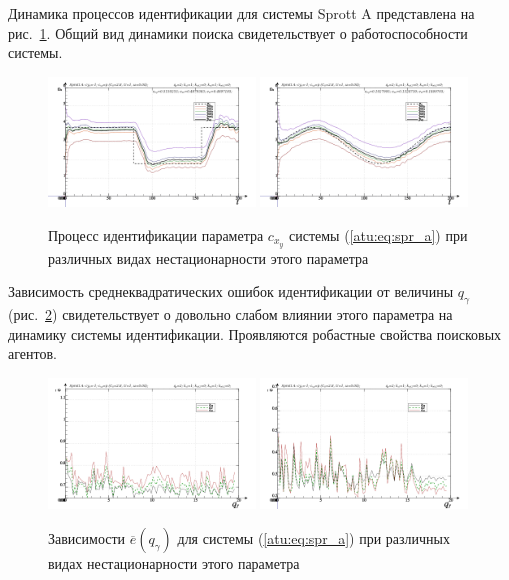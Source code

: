 Динамика процессов идентификации для системы Sprott A представлена на рис.~\ref{atu:f:spr_a_id}.
Общий вид динамики поиска свидетельствует о работоспособности системы.

\begin{figure}[htb!]
\centerline{
  \includegraphics[width=0.49\textwidth]{p/cha/spr_a/sprott_a_m5p-pl_n_sign.png}
  \includegraphics[width=0.49\textwidth]{p/cha/spr_a/sprott_a_m5p-pl_n_sin.png}
}
\caption{Процесс идентификации параметра $c_{x_y} $ системы (\ref{atu:eq:spr_a})
  при различных видах нестационарности этого параметра
}
\label{atu:f:spr_a_id}
\end{figure}

Зависимость среднеквадратических ошибок идентификации от величины $q_\gamma$ (рис.~\ref{atu:f:spr_a_e_qgamma})
свидетельствует о довольно слабом влиянии этого параметра
на динамику системы идентификации.
Проявляются робастные свойства поисковых агентов.

\begin{figure}[htb!]
\centerline{
  \includegraphics[width=0.49\textwidth]{p/cha/spr_a/sprott_a_m5p-p_qg_e_sign.png}
  \includegraphics[width=0.49\textwidth]{p/cha/spr_a/sprott_a_m5p-p_qg_e_sin.png}
}
  \caption{Зависимости  $\overline{e}(q_\gamma)$ для системы (\ref{atu:eq:spr_a})
  при различных видах нестационарности этого параметра
}
\label{atu:f:spr_a_e_qgamma}
\end{figure}


